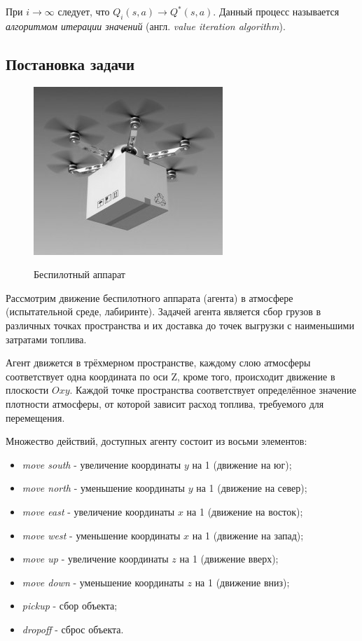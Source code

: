 \documentclass[a4paper]{report}
\theoremstyle{definition}
\theoremstyle{plain}
\theoremstyle{remark}
\theoremstyle{remark}
\theoremstyle{definition}
\begin{document}
При $i \rightarrow \infty$ следует, что $Q_{i}(s, a) \rightarrow Q^*(s, a)$. Данный процесс называется \textit{алгоритмом итерации значений} (англ. \textit{value iteration algorithm}).

\newpage
\begin{center}
\section{Постановка задачи}
\end{center}

\begin{figure}[H]
	{\includegraphics[scale = 0.6]{dronebw.jpg}}
	\caption{Беспилотный аппарат}
\end{figure}

Рассмотрим движение беспилотного аппарата (агента) в атмосфере (испытательной среде, лабиринте). Задачей агента является сбор грузов в различных точках пространства и их доставка до точек выгрузки с наименьшими затратами топлива.

Агент движется в трёхмерном пространстве, каждому слою атмосферы соответствует одна координата по оси Z, кроме того, происходит движение в плоскости $Oxy$. Каждой точке пространства соответствует определённое значение плотности атмосферы, от которой зависит расход топлива, требуемого для перемещения.

Множество действий, доступных агенту состоит из восьми элементов:
\begin{itemize}
  	\item \textit{move south} - увеличение координаты $y$ на 1 (движение на юг);
	\item \textit{move north} - уменьшение координаты $y$ на 1 (движение на север);
	\item \textit{move east} - увеличение координаты $x$ на 1 (движение на восток);
	\item \textit{move west} - уменьшение координаты $x$ на 1 (движение на запад);
	\item \textit{move up} - увеличение координаты $z$ на 1 (движение вверх);
	\item \textit{move down} - уменьшение координаты $z$ на 1 (движение вниз);
	\item \textit{pickup} - сбор объекта;
	\item \textit{dropoff} - сброс объекта.	
\end{itemize}
\end{document}
